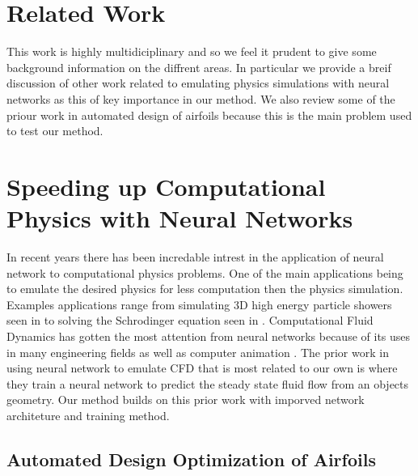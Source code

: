 \documentclass{article} %
\begin{document}
\section{Related Work}

This work is highly multidiciplinary and so we feel it prudent to give some background information on the diffrent areas. In particular we provide a breif discussion of other work related to emulating physics simulations with neural networks as this of key importance in our method. We also review some of the priour work in automated design of airfoils because this is the main problem used to test our method.

\section{Speeding up Computational Physics with Neural Networks}

In recent years there has been incredable intrest in the application of neural network to computational physics problems. One of the main applications being to emulate the desired physics for less computation then the physics simulation. Examples applications range from simulating 3D high energy particle showers seen in \citep{2017arXiv170502355P} to solving the Schrodinger equation seen in \citep{mills2017deep}. Computational Fluid Dynamics has gotten the most attention from neural networks because of its uses in many engineering fields as well as computer animation \cite{tompson2016accelerating} \cite{2017arXiv170509036H}. The prior work in using neural network to emulate CFD that is most related to our own is \citep{demultiplexera} where they train a neural network to predict the steady state fluid flow from an objects geometry. Our method builds on this prior work with imporved network architeture and training method.

\subsection{Automated Design Optimization of Airfoils}
\end{document}
